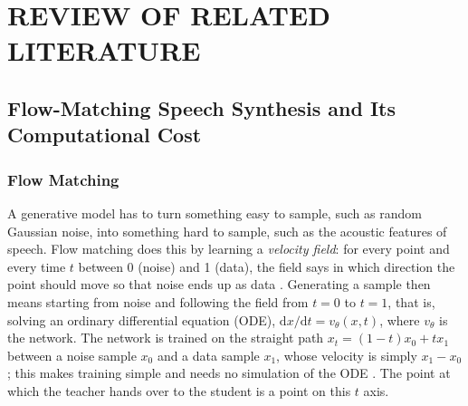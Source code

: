 
\section{REVIEW OF RELATED LITERATURE}
\label{sec:related}


\subsection{Flow-Matching Speech Synthesis and Its Computational Cost}
\label{sec:rrl-fm}

\subsubsection{Flow Matching}

A generative model has to turn something easy to sample, such as random Gaussian noise, into something hard to sample, such as the acoustic features of speech. Flow matching does this by learning a \emph{velocity field}: for every point and every time $t$ between 0 (noise) and 1 (data), the field says in which direction the point should move so that noise ends up as data \parencite{lipman2023flow,lipman2024guide,liu2023flow}. Generating a sample then means starting from noise and following the field from $t=0$ to $t=1$, that is, solving an ordinary differential equation (ODE), $\mathrm{d}x/\mathrm{d}t = v_\theta(x,t)$, where $v_\theta$ is the network. The network is trained on the straight path $x_t=(1-t)x_0+t x_1$ between a noise sample $x_0$ and a data sample $x_1$, whose velocity is simply $x_1-x_0$; this makes training simple and needs no simulation of the ODE \parencite{chen2018neuralode,lipman2023flow}. The point at which the teacher hands over to the student is a point on this $t$ axis.

